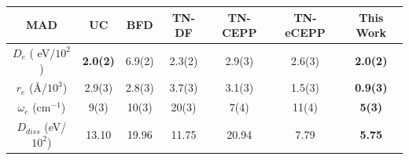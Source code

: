 \begin{frame}

  \large

\begin{figure}
  \color{black}
  \centering
\end{figure}

\small
\centering
\color{black}
    \begin{tabular}{c | cccccc}
	\hline
	\hline
	       MAD   &   UC  &   BFD  &    TN-DF &   TN-CEPP &  TN-eCEPP &   This Work \\
	\hline
	 $D_e$    (  eV/$10^2$)     &    {\color{ForestGreen}\bf 2.0(2)} &     6.9(2) &     2.3(2) &     2.9(3) &     2.6(3) &   {\color{ForestGreen}\bf 2.0(2)}   \\
	 $r_e$      (\AA/$10^3$)    &    2.9(3) &     2.8(3) &     3.7(3) &     3.1(3) &     1.5(3) &   {\color{ForestGreen}\bf 0.9(3)}   \\
	 $\omega_e$ (cm$^{-1}$)     &      9(3) &      10(3) &      20(3) &       7(4) &      11(4) &     {\color{ForestGreen}\bf 5(3)}   \\
	 $D_{diss}$      (eV/$10^2$)      &    13.10 &      19.96 &     11.75  &     20.94   &     7.79 &       {\color{ForestGreen}\bf 5.75} \\
	 \hline
	 \hline
    \end{tabular}

\end{frame}

